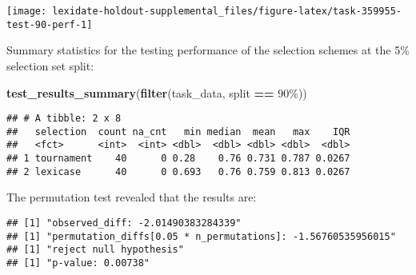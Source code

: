\documentclass[
]{book}
\newenvironment{Shaded}{\begin{snugshade}}{\end{snugshade}}
\newcommand{\AttributeTok}[1]{\textcolor[rgb]{0.13,0.29,0.53}{#1}}
\newcommand{\DecValTok}[1]{\textcolor[rgb]{0.00,0.00,0.81}{#1}}
\newcommand{\FunctionTok}[1]{\textcolor[rgb]{0.13,0.29,0.53}{\textbf{#1}}}
\newcommand{\NormalTok}[1]{#1}
\newcommand{\OtherTok}[1]{\textcolor[rgb]{0.56,0.35,0.01}{#1}}
\newcommand{\SpecialCharTok}[1]{\textcolor[rgb]{0.81,0.36,0.00}{\textbf{#1}}}
\newcommand{\StringTok}[1]{\textcolor[rgb]{0.31,0.60,0.02}{#1}}
\begin{document}
\texttt{[image: lexidate-holdout-supplemental\_files/figure-latex/task-359955-test-90-perf-1]}

Summary statistics for the testing performance of the selection schemes at the 5\% selection set split:

\begin{Shaded}
\begin{Highlighting}[]
\FunctionTok{test\_results\_summary}\NormalTok{(}\FunctionTok{filter}\NormalTok{(task\_data, split }\SpecialCharTok{==} \StringTok{\textquotesingle{}90\%\textquotesingle{}}\NormalTok{))}
\end{Highlighting}
\end{Shaded}

\begin{verbatim}
## # A tibble: 2 x 8
##   selection  count na_cnt   min median  mean   max    IQR
##   <fct>      <int>  <int> <dbl>  <dbl> <dbl> <dbl>  <dbl>
## 1 tournament    40      0 0.28    0.76 0.731 0.787 0.0267
## 2 lexicase      40      0 0.693   0.76 0.759 0.813 0.0267
\end{verbatim}

The permutation test revealed that the results are:

\begin{Shaded}
\end{Shaded}

\begin{verbatim}
## [1] "observed_diff: -2.01490383284339"
## [1] "permutation_diffs[0.05 * n_permutations]: -1.56760535956015"
## [1] "reject null hypothesis"
## [1] "p-value: 0.00738"
\end{verbatim}
\end{document}
